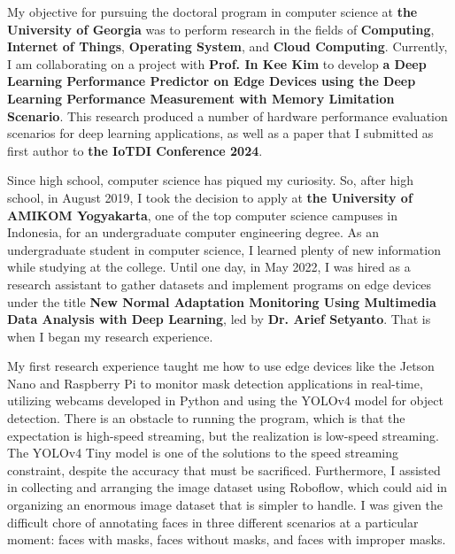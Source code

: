 \documentclass{article}
\newcommand{\school}{the University of Georgia\xspace}
\newcommand{\profOne}{Prof. In Kee Kim\xspace}
\newcommand{\profTwo}{Dr. Arief Setyanto\xspace}
\begin{document}

My objective for pursuing the doctoral program in computer science at \textbf{\school} was to perform research in the fields of \textbf{Computing}, \textbf{Internet of Things}, \textbf{Operating System}, and \textbf{Cloud Computing}. Currently, I am collaborating on a project with \textbf{\profOne} to develop \textbf{a Deep Learning Performance Predictor on Edge Devices using the Deep Learning Performance Measurement with Memory Limitation Scenario}. This research produced a number of hardware performance evaluation scenarios for deep learning applications, as well as a paper that I submitted as first author to \textbf{the IoTDI Conference 2024}.



Since high school, computer science has piqued my curiosity. So, after high school, in August 2019, I took the decision to apply at \textbf{the University of AMIKOM Yogyakarta}, one of the top computer science campuses in Indonesia, for an undergraduate computer engineering degree. As an undergraduate student in computer science, I learned plenty of new information while studying at the college. Until one day, in May 2022, I was hired as a research assistant to gather datasets and implement programs on edge devices under the title \textbf{New Normal Adaptation Monitoring Using Multimedia Data Analysis with Deep Learning}, led by \textbf{\profTwo}. That is when I began my research experience.


My first research experience taught me how to use edge devices like the Jetson Nano and Raspberry Pi to monitor mask detection applications in real-time, utilizing webcams developed in Python and using the YOLOv4 model for object detection. There is an obstacle to running the program, which is that the expectation is high-speed streaming, but the realization is low-speed streaming. The YOLOv4 Tiny model is one of the solutions to the speed streaming constraint, despite the accuracy that must be sacrificed. Furthermore, I assisted in collecting and arranging the image dataset using Roboflow, which could aid in organizing an enormous image dataset that is simpler to handle. I was given the difficult chore of annotating faces in three different scenarios at a particular moment: faces with masks, faces without masks, and faces with improper masks.
\end{document}
